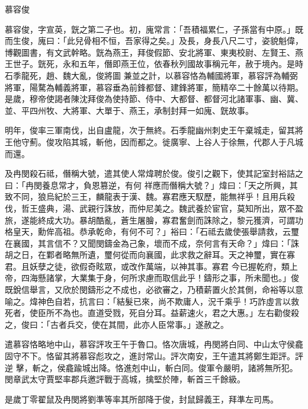 
\begin{pinyinscope}

 慕容俊



 慕容俊，字宣英，皝之第二子也。初，廆常言：「吾積福累仁，子孫當有中原。」既而生俊，廆曰：「此兒骨相不恒，吾家得之矣。」及長，身長八尺二寸，姿貌魁偉，博觀圖書，有文武幹略。皝為燕王，拜俊假節、安北將軍、東夷校尉、左賢王、燕王世子。皝死，永和五年，僭即燕王位，依春秋列國故事稱元年，赦于境內。是時石季龍死，趙、魏大亂，俊將圖
 兼並之計，以慕容恪為輔國將軍，慕容評為輔弼將軍，陽騖為輔義將軍，慕容垂為前鋒都督、建鋒將軍，簡精卒二十餘萬以待期。是歲，穆帝使謁者陳沈拜俊為使持節、侍中、大都督、都督河北諸軍事、幽、冀、並、平四州牧、大將軍、大單于、燕王，承制封拜一如廆、皝故事。



 明年，俊率三軍南伐，出自盧龍，次于無終。石季龍幽州刺史王午棄城走，留其將王他守薊。俊攻陷其城，斬他，因而都之。徙廣寧、上谷人于徐無，代郡人于凡城而還。



 及冉閔殺石祗，僭稱大號，遣其使人常煒聘於俊。俊引之觀下，使其記室封裕詰之曰：「冉閔養息常才，負恩篡逆，有何
 祥應而僭稱大號？」煒曰：「天之所興，其致不同，狼烏紀於三王，麟龍表于漢、魏。寡君應天馭歷，能無祥乎！且用兵殺伐，哲王盛典，湯、武親行誅放，而仲尼美之。魏武養於宦官，莫知所出，眾不盈旅，遂能終成大功。暴胡酷亂，蒼生屠膾，寡君奮劍而誅除之，黎元獲濟，可謂功格皇天，勳侔高祖。恭承乾命，有何不可？」裕曰：「石祗去歲使張舉請救，云璽在襄國，其言信不？又聞閔鑄金為己象，壞而不成，奈何言有天命？」煒曰：「誅胡之日，在鄴者略無所遺，璽何從而向襄國，此求救之辭耳。天之神璽，實在寡君。且妖孽之徒，欲假奇眩眾，或改作萬端，以神其事。寡君
 今已握乾府，類上帝，四海懸諸掌，大業集于身，何所求慮而取信此乎！鑄形之事，所未聞也。」俊既銳信舉言，又欣於閔鑄形之不成也，必欲審之，乃積薪置火於其側，命裕等以意喻之。煒神色自若，抗言曰：「結髮已來，尚不欺庸人，況千乘乎！巧詐虛言以救死者，使臣所不為也。直道受戮，死自分耳。益薪速火，君之大惠。」左右勸俊殺之，俊曰：「古者兵交，使在其間，此亦人臣常事。」遂赦之。



 遣慕容恪略地中山，慕容評攻王午于魯口。恪次唐城，冉閔將白同、中山太守侯龕固守不下。恪留其將慕容彪攻之，進討常山。評次南安，王午遣其將鄭生距評。評逆
 擊，斬之，侯龕踰城出降。恪進剋中山，斬白同。俊軍令嚴明，諸將無所犯。閔章武太守賈堅率郡兵邀評戰于高城，擒堅於陣，斬首三千餘級。



 是歲丁零翟鼠及冉閔將劉準等率其所部降于俊，封鼠歸義王，拜準左司馬。




\end{pinyinscope}
